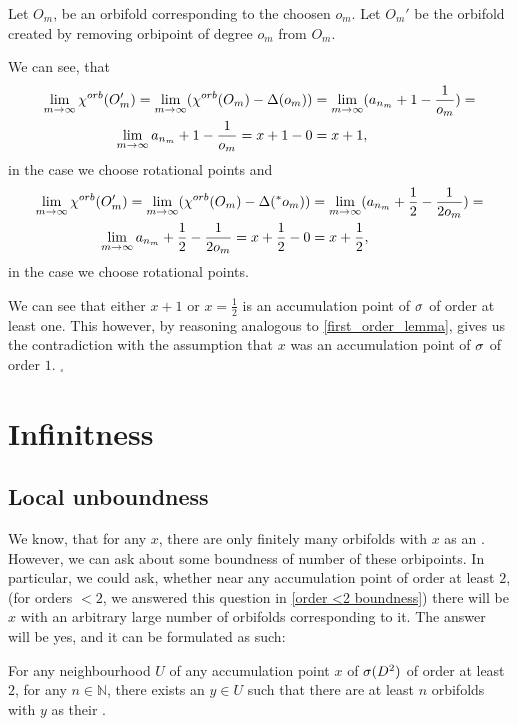 Let $O_m$, be an orbifold corresponding to the choosen $o_m$. Let $O_m'$ be the orbifold 
created by removing orbipoint of degree $o_m$ from $O_m$. 

We can see, that 
\begin{align}
\lim_{m\to \infty} {\chi^{orb}(O_m')} = \lim_{m\to\infty}( {\chi^{orb}(O_m)} - \Delta(o_m) )&= 
 \lim_{m\to\infty} (a_{n_m} + 1 - \frac{1}{o_m}) = \notag \\
 \lim_{m\to\infty} a_{n_m} + 1 -  \frac{1}{o_m} = x + 1 - 0 &= x+1,
\end{align} 
in the case we choose rotational points and 
\begin{align}
\lim_{m\to \infty} {\chi^{orb}(O_m')} = \lim_{m\to\infty}( {\chi^{orb}(O_m)} - \Delta(^*o_m) )&= 
 \lim_{m\to\infty} (a_{n_m} + \frac{1}{2} - \frac{1}{2o_m}) = \notag \\
 \lim_{m\to\infty} a_{n_m} + \frac{1}{2} -  \frac{1}{2o_m} = x + \frac{1}{2} - 0 &= x+\frac{1}{2},
\end{align} 
in the case we choose rotational points. 

We can see that either $x+1$ or $x = \frac{1}{2}$ is an accumulation point of ${\sigma}$ of order at 
least one. This however, by reasoning analogous to \ref{first_order_lemma}, 
gives us the contradiction 
with the assumption that $x$ was an accumulation point of ${\sigma}$ of order $1$. $_\square$



\section{Infinitness}\label{infiniteness}
\subsection{Local unboundness}
We know, that for any $x$, there are only finitely many orbifolds with $x$ as an \Eoc . 
However, we can ask about some boundness of number of these orbipoints. 
In particular, we could ask, whether near any accumulation point of order at least $2$, 
(for orders $<2$, we answered this question in \ref{order <2 boundness})
there will be $x$ with an 
arbitrary large number of orbifolds corresponding to it. 
The answer will be yes, and it can be formulated as such:
\begin{theorem}\label{unboundness}
For any neighbourhood $U$ of any accumulation point $x$ of ${{\sigma}(D^2)}$ of order at least $2$, for any 
$n\in \mathbb{N}$, 
there exists an $y\in U$ such that there are at least $n$ orbifolds with $y$ as their 
\Eoc. 
\end{theorem}
